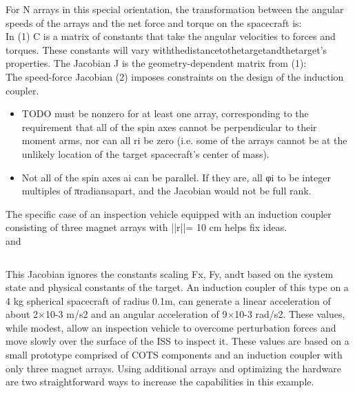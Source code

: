 \documentclass{article}
\begin{document}
For N arrays in this special orientation, the transformation between the angular speeds of the arrays and the net force and torque on the spacecraft is:
\begin{equation}\label{eq:forces}
\end{equation}
In (1) C is a matrix of constants that take the angular velocities to forces and torques. These constants will vary ‎with‎the‎distance‎to‎the‎target‎and‎the‎target’s‎ properties.
The Jacobian J is the geometry-dependent matrix from (1):
\begin{equation}\label{eq:genJacobian}
\end{equation}
The speed-force Jacobian (2) imposes constraints on the design of the induction coupler.

\begin{itemize}
\item  TODO must be nonzero for at least one array, corresponding to the requirement that all of the spin axes cannot be perpendicular to their moment arms, nor can all ri be zero (i.e. some of the arrays cannot be at the unlikely location of the target spacecraft's center of mass).
\item  Not all of the spin axes ai can be parallel. If they are, all φi to be integer multiples of π‎radians‎apart, and the Jacobian would not be full rank.
\end{itemize}

The specific case of an inspection vehicle equipped with an induction coupler consisting of three magnet arrays with ||r||= 10 cm helps fix ideas.
\begin{equation}\label{eq:specificPhi}
\end{equation}
and
\begin{equation}\label{eq:specificR}
\end{equation}

\begin{equation}\label{eq:specificJac}
\end{equation}

This Jacobian ignores the constants scaling Fx, Fy, and‎τ‎ based on the system state and physical constants of the target.
An induction coupler of this type on a 4 kg spherical spacecraft of radius 0.1m, can generate a linear acceleration of about 2×10-3 m/s2 and an angular acceleration of 9×10-3 rad/s2. These values, while modest, allow an inspection vehicle to overcome perturbation forces and move slowly over the surface of the ISS to inspect it. These values are based on a small prototype comprised of COTS components and an induction coupler with only three magnet arrays. Using additional arrays and optimizing the hardware are two straightforward ways to increase the capabilities in this example.
\end{document}
